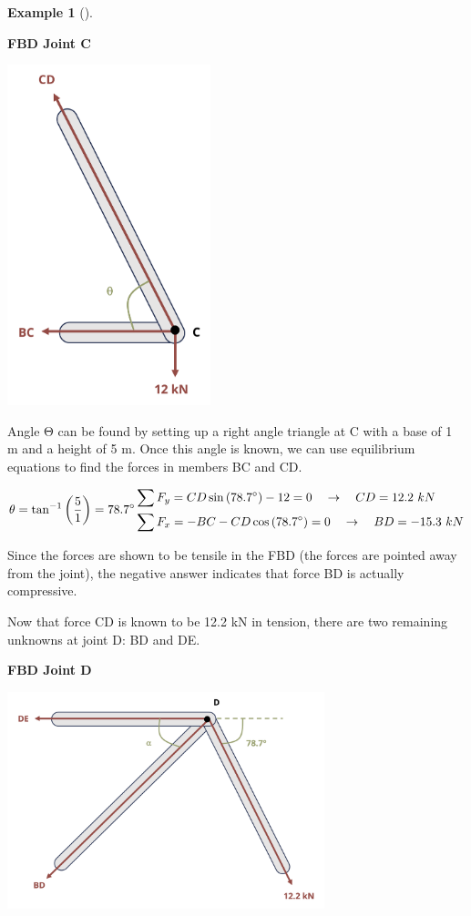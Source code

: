 \documentclass[
  letterpaper,
  DIV=11,
  numbers=noendperiod]{scrreprt}
\theoremstyle{definition}
\newtheorem{example}{Example}[chapter]
\theoremstyle{remark}
\begin{document}
\begin{tcolorbox}
\begin{example}[]
\begin{tcolorbox}
\textbf{FBD Joint C}

\begin{center}
\includegraphics[width=2.32292in,height=\textheight]{images/Updated CH1 examples/example 1.4 part 2.png}
\end{center}

Angle Θ can be found by setting up a right angle triangle at C with a
base of 1 m and a height of 5 m. Once this angle is known, we can use
equilibrium equations to find the forces in members BC and CD.~

\[
\theta=\tan ^{-1}\left(\frac{5}{1}\right)=78.7^{\circ} \\
\\
\begin{aligned}
&\sum F_y=C D \sin \left(78.7^{\circ}\right)-12=0 \quad\rightarrow\quad C D=12.2{~kN} \\
&\sum F_x=-B C-C D \cos \left(78.7^{\circ}\right)=0 \quad\rightarrow\quad B D=-15.3{~kN}
\end{aligned}
\]

Since the forces are shown to be tensile in the FBD (the forces are
pointed away from the joint), the negative answer indicates that force
BD is actually compressive.

Now that force CD is known to be 12.2 kN in tension, there are two
remaining unknowns at joint D: BD and DE.

\textbf{FBD Joint D}

\begin{center}
\includegraphics[width=3.625in,height=\textheight]{images/Updated CH1 examples/example 1.4 part 3.png}
\end{center}


\end{tcolorbox}
\end{example}
\end{tcolorbox}
\end{document}
